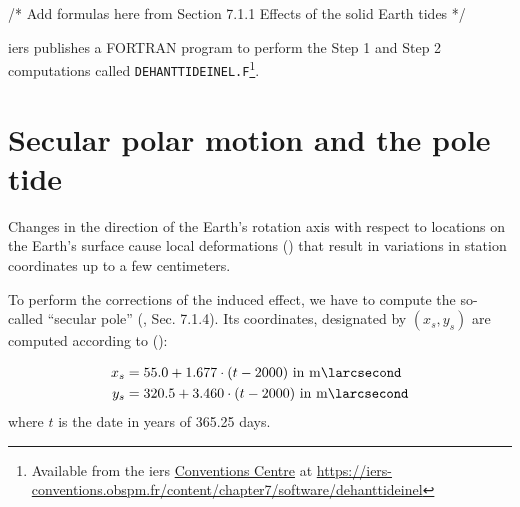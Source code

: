 /* Add formulas here from Section 7.1.1 Effects of the solid Earth tides */

\gls{iers} publishes a FORTRAN program to perform the Step 1 and Step 2 computations 
called \texttt{DEHANTTIDEINEL.F}\footnote{Available from the \gls{iers} \href{https://iers-conventions.obspm.fr/}{Conventions Centre} at \url{https://iers-conventions.obspm.fr/content/chapter7/software/dehanttideinel}}.

\section{Secular polar motion and the pole tide}
\label{sec:pole-tides}

Changes in the direction of the Earth's rotation axis with respect to locations 
on the Earth's surface cause local deformations (\cite{Desai2002}) that result in 
variations in station coordinates up to a few centimeters.

To perform the corrections of the induced effect, we have to compute the so-called 
``secular pole'' (\cite{iers2010}, Sec. 7.1.4). Its coordinates, designated by 
$(x_s, y_s)$ are computed according to (\cite{iers2010}):

\begin{equation}
  \begin{aligned}
    x_s &= 55.0 + 1.677 \cdot (t-2000) \text{ in } \si{\milli\larcsecond} \\
    y_s &=  320.5 + 3.460 \cdot (t-2000) \text{ in } \si{\milli\larcsecond}
  \end{aligned}
\end{equation}
where $t$ is the date in years of 365.25 days.

